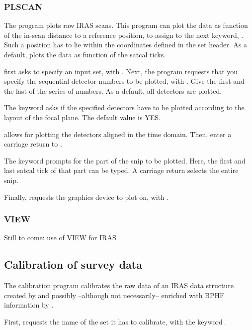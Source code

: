 \subsubsection{PLSCAN}

The program  plots raw IRAS scans.  This program can
plot the data as function of the in-scan distance to a reference
position, to assign to the next keyword, .  Such a
position has to lie within the coordinates defined in the set header. 
As a default,  plots the data as function of the satcal
ticks. 

 first asks to specify an input set, with
.  Next, the program requests that you specify the sequential
detector numbers to be plotted, with .  Give the first
and the last of the series of numbers.  As a default, all detectors are
plotted. 

The keyword  asks if the specified detectors have to be
plotted according to the layout of the focal plane.  The default value
is YES. 

 allows for plotting the detectors aligned in the time
domain.  Then, enter a carriage return to . 

The keyword  prompts for the part of the snip to be
plotted.  Here, the first and last satcal tick of that part can be
typed.  A carriage return selects the entire snip. 

Finally,  requests the graphics device to plot on, with
. 

\subsubsection{VIEW}

Still to come: use of VIEW for IRAS

\subsection{Calibration of survey data}
\label{ssec:IntCal}

The calibration program  calibrates the raw data of an
IRAS data structure created by  and possibly --although
not necessarily-- enriched with BPHF information by . 

First,  requests the name of the set it has to
calibrate, with the keyword . 

